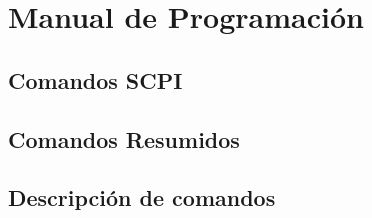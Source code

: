 \chapter[Manual de Programación]{Manual de Programación}
\label{cp:manual-programacion}

\section*{Comandos SCPI}

\section*{Comandos Resumidos}

\section{Descripción de comandos}
